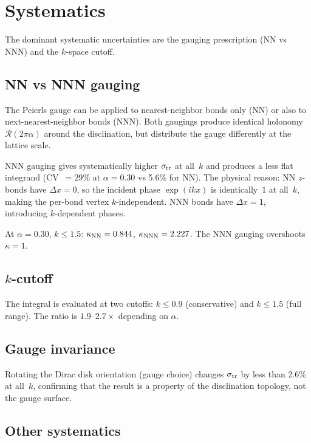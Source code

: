 \documentclass[11pt]{article}
\begin{document}
\section{Systematics}
\label{sec:systematics}

The dominant systematic uncertainties are the gauging prescription (NN vs NNN)
and the $k$-space cutoff.

\subsection{NN vs NNN gauging}

The Peierls gauge can be applied to nearest-neighbor bonds only (NN) or also
to next-nearest-neighbor bonds (NNN). Both gaugings produce identical holonomy
$\mathcal{R}(2\pi\alpha)$ around the disclination, but distribute the gauge
differently at the lattice scale.

NNN gauging gives systematically higher $\sigma_{\rm tr}$ at all~$k$ and
produces a less flat integrand (CV~$= 29\%$ at $\alpha = 0.30$ vs 5.6\% for
NN). The physical reason: NN $z$-bonds have $\Delta x = 0$, so the incident
phase $\exp(ikx)$ is identically~1 at all~$k$, making the per-bond vertex
$k$-independent. NNN bonds have $\Delta x = 1$, introducing $k$-dependent
phases.

At $\alpha = 0.30$, $k \leq 1.5$: $\kappa_{\rm NN} = 0.844$,
$\kappa_{\rm NNN} = 2.227$. The NNN gauging overshoots $\kappa = 1$.

\subsection{\texorpdfstring{$k$}{k}-cutoff}

The integral is evaluated at two cutoffs: $k \leq 0.9$ (conservative) and
$k \leq 1.5$ (full range). The ratio is $1.9$--$2.7\times$ depending on
$\alpha$.

\subsection{Gauge invariance}

Rotating the Dirac disk orientation (gauge choice) changes $\sigma_{\rm tr}$
by less than 2.6\% at all~$k$, confirming that the result is a property of
the disclination topology, not the gauge surface.

\subsection{Other systematics}
\end{document}
